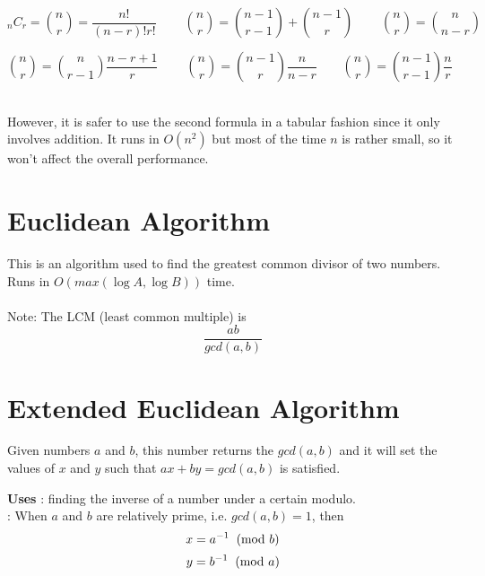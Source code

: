 	$$
	{_n}C_r = {{n}\choose{r}} = \frac{n!}{(n-r)!r!}\ \ \ \ \ \ \ \ \ \ 
	{{n}\choose{r}} = {{n-1}\choose{r-1}} + {{n-1}\choose{r}}\ \ \ \ \ \ \ \ \ \ 
	{{n}\choose{r}} = {{n}\choose{n-r}}
	$$
	
	$$
	{{n}\choose{r}} = {{n}\choose{r-1}}\frac{n-r+1}{r}\ \ \ \ \ \ \ \ \ \ 
	{{n}\choose{r}} = {{n-1}\choose{r}}\frac{n}{n-r}\ \ \ \ \ \ \ \ \ 
	{{n}\choose{r}} = {{n-1}\choose{r-1}}\frac{n}{r}\ \ \ \ \ \ \ \ \ 
	$$
	
	
	\ \\
	\indent However, it is safer to use the second formula in a tabular fashion since 
	it only involves addition. It runs in $O(n^2)$ but most of the time $n$ is
	rather small, so it won't affect the overall performance. \\
	
	
	
	\section{Euclidean Algorithm}
	
	\indent This is an algorithm used to find the greatest common divisor of two numbers.
	Runs in $O(max(\log{A}, \log{B}))$ time. \\
	
	
	\ \\
	Note: The LCM (least common multiple) is $$\frac{ab}{gcd(a,b)}$$
	
	\section{Extended Euclidean Algorithm}
	
	\indent Given numbers $a$ and $b$, this number returns the $gcd(a,b)$ and it will 
	set the values of $x$ and $y$ such that $ax + by = gcd(a,b)$ is satisfied.
	
	{\bf Uses} : finding the inverse of a number under a certain modulo.\\
	 : When $a$ and $b$ are relatively prime, i.e. $gcd(a,b) = 1$, then 
	$$x = a^{-1} \imod{b}$$
	$$y = b^{-1} \imod{a}$$
	
